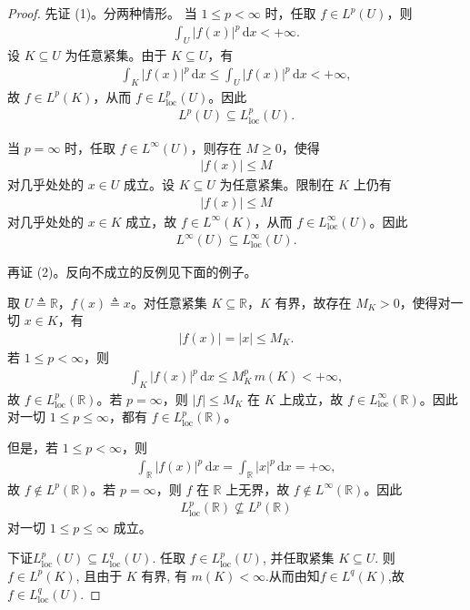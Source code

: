 \documentclass[../../main.tex]{subfiles}
\begin{document}
\begin{proof}

先证 (1)。分两种情形。
当 \(1\leqslant p<\infty\) 时，任取 \(f\in L^p(U)\)，则
\begin{align*}
\int_U |f(x)|^p\,\mathrm{d}x<+\infty.
\end{align*}
设 \(K\subseteq U\) 为任意紧集。由于 \(K\subseteq U\)，有
\begin{align*}
\int_K |f(x)|^p\,\mathrm{d}x
\leqslant \int_U |f(x)|^p\,\mathrm{d}x
<+\infty,
\end{align*}
故 \(f\in L^p(K)\)，从而 \(f\in L^p_{\mathrm{loc}}(U)\)。因此
\begin{align*}
L^p(U)\subseteq L^p_{\mathrm{loc}}(U).
\end{align*}

当 \(p=\infty\) 时，任取 \(f\in L^\infty(U)\)，则存在 \(M\geqslant0\)，使得
\begin{align*}
|f(x)|\leqslant M
\end{align*}
对几乎处处的 \(x\in U\) 成立。设 \(K\subseteq U\) 为任意紧集。限制在 \(K\) 上仍有
\begin{align*}
|f(x)|\leqslant M
\end{align*}
对几乎处处的 \(x\in K\) 成立，故 \(f\in L^\infty(K)\)，从而 \(f\in L^\infty_{\mathrm{loc}}(U)\)。因此
\begin{align*}
L^\infty(U)\subseteq L^\infty_{\mathrm{loc}}(U).
\end{align*}

再证 (2)。反向不成立的反例见下面的例子。

取 \(U\triangleq\mathbb{R}\)，\(f(x)\triangleq x\)。对任意紧集 \(K\subseteq\mathbb{R}\)，\(K\) 有界，故存在 \(M_K>0\)，使得对一切 \(x\in K\)，有
\begin{align*}
|f(x)|=|x|\leqslant M_K.
\end{align*}
若 \(1\leqslant p<\infty\)，则
\begin{align*}
\int_K |f(x)|^p\,\mathrm{d}x
\leqslant M_K^p\,m(K)<+\infty,
\end{align*}
故 \(f\in L^p_{\mathrm{loc}}(\mathbb{R})\)。若 \(p=\infty\)，则 \(|f|\leqslant M_K\) 在 \(K\) 上成立，故 \(f\in L^\infty_{\mathrm{loc}}(\mathbb{R})\)。因此对一切 \(1\leqslant p\leqslant\infty\)，都有 \(f\in L^p_{\mathrm{loc}}(\mathbb{R})\)。

但是，若 \(1\leqslant p<\infty\)，则
\begin{align*}
\int_{\mathbb{R}} |f(x)|^p\,\mathrm{d}x
=\int_{\mathbb{R}} |x|^p\,\mathrm{d}x
=+\infty,
\end{align*}
故 \(f\notin L^p(\mathbb{R})\)。若 \(p=\infty\)，则 \(f\) 在 \(\mathbb{R}\) 上无界，故 \(f\notin L^\infty(\mathbb{R})\)。因此
\begin{align*}
L^p_{\mathrm{loc}}(\mathbb{R})\nsubseteq L^p(\mathbb{R})
\end{align*}
对一切 \(1\leqslant p\leqslant\infty\) 成立。

下证$L^p_{\mathrm{loc}}(U)\subseteq L^q_{\mathrm{loc}}(U).$
任取 $f\in L^p_{\mathrm{loc}}(U)$, 并任取紧集 $K\subseteq U$. 则 $f\in L^p(K)$, 且由于 $K$ 有界, 有 $m(K)<\infty$.从而由知$f\in L^q(K)$,故$f\in L^q_{\mathrm{loc}}(U).$
\end{proof}
\end{document}
